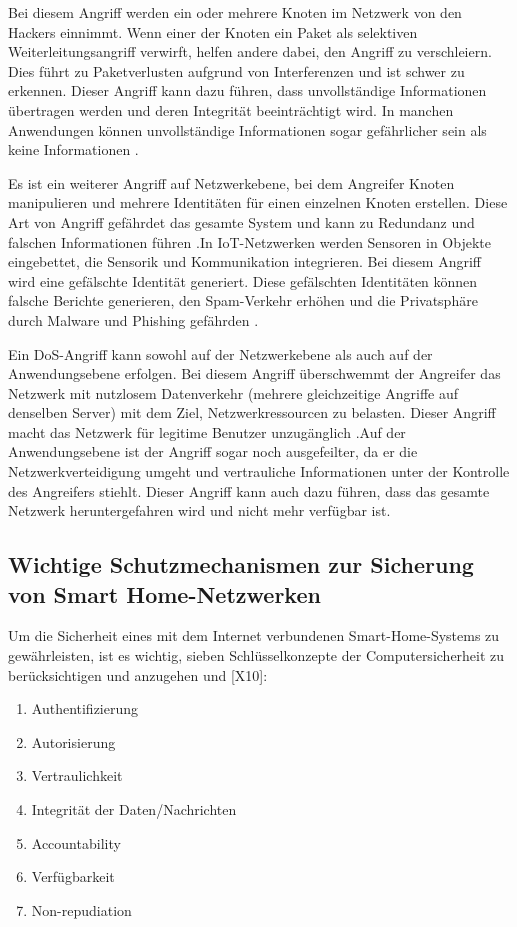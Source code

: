 Bei diesem Angriff werden ein oder mehrere Knoten im Netzwerk von den Hackers einnimmt. Wenn einer der Knoten ein Paket als selektiven Weiterleitungsangriff verwirft, helfen andere dabei, den Angriff zu verschleiern. Dies führt zu Paketverlusten aufgrund von Interferenzen und ist schwer zu erkennen. Dieser Angriff kann dazu führen, dass unvollständige Informationen übertragen werden und deren Integrität beeinträchtigt wird. In manchen Anwendungen können unvollständige Informationen sogar gefährlicher sein als keine Informationen \cite{s16010118} .

Es ist ein weiterer Angriff auf Netzwerkebene, bei dem Angreifer Knoten manipulieren und mehrere Identitäten für einen einzelnen Knoten erstellen. Diese Art von Angriff gefährdet das gesamte System und kann zu Redundanz und falschen Informationen führen \cite{pawar2016sybil} .In IoT-Netzwerken werden Sensoren in Objekte eingebettet, die Sensorik und Kommunikation integrieren. Bei diesem Angriff wird eine gefälschte Identität generiert. Diese gefälschten Identitäten können falsche Berichte generieren, den Spam-Verkehr erhöhen und die Privatsphäre durch Malware und Phishing gefährden \cite{alqassem2014privacy} .

Ein DoS-Angriff kann sowohl auf der Netzwerkebene als auch auf der Anwendungsebene erfolgen. Bei diesem Angriff überschwemmt der Angreifer das Netzwerk mit nutzlosem Datenverkehr (mehrere gleichzeitige Angriffe auf denselben Server) mit dem Ziel, Netzwerkressourcen zu belasten. Dieser Angriff macht das Netzwerk für legitime Benutzer unzugänglich \cite{kozlov2012security} .Auf der Anwendungsebene ist der Angriff sogar noch ausgefeilter, da er die Netzwerkverteidigung umgeht und vertrauliche Informationen unter der Kontrolle des Angreifers stiehlt. Dieser Angriff kann auch dazu führen, dass das gesamte Netzwerk heruntergefahren wird und nicht mehr verfügbar ist\cite{pawar2016sybil}.
\newpage

\subsection{Wichtige Schutzmechanismen zur Sicherung von Smart Home-Netzwerken} 
Um die Sicherheit eines mit dem Internet verbundenen Smart-Home-Systems zu gewährleisten, ist es wichtig, sieben Schlüsselkonzepte der Computersicherheit zu berücksichtigen und anzugehen \cite{khatoun2022cybersecurity} und [X10]:
 \begin{enumerate}
     \item Authentifizierung
\item Autorisierung
\item Vertraulichkeit
\item Integrität der Daten/Nachrichten
\item Accountability
\item Verfügbarkeit
\item Non-repudiation
 \end{enumerate}


